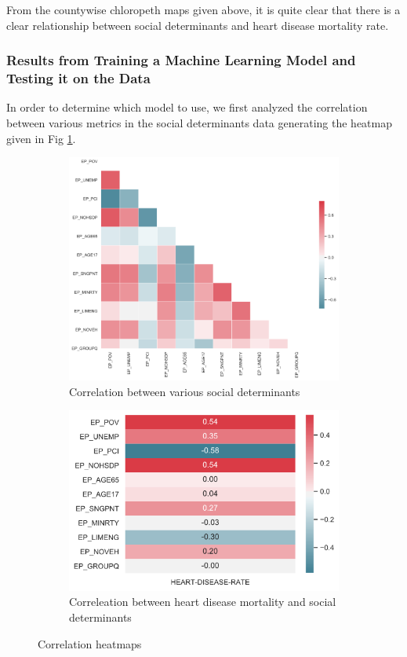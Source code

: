 \documentclass[journal,12pt,onecolumn]{IEEEtran}
\begin{document}
From the countywise chloropeth maps given above, it is quite clear that there is a clear relationship between social determinants and heart disease mortality rate.


\subsubsection{Results from Training a Machine Learning Model and Testing it on the Data}
In order to determine which model to use, we first analyzed the correlation between various metrics in the social determinants data generating the heatmap given in Fig \ref{fig:sviheatmap}.


\begin{figure}[H]
  \centering
  \begin{subfigure}{.5\textwidth}
  \centering
  \includegraphics[width=\linewidth]{figures/ml1.PNG}
  \caption{Correlation between various social determinants}
  \label{fig:sviheatmap}
\end{subfigure}%
\begin{subfigure}{.5\textwidth}
  \centering
  \includegraphics[width=\linewidth]{figures/ml2.PNG}
  \caption{Correleation between heart disease mortality and social determinants}
  \label{fig:hdheatmap}
\end{subfigure}
\caption{Correlation heatmaps}
\label{}
\end{figure}
\end{document}
